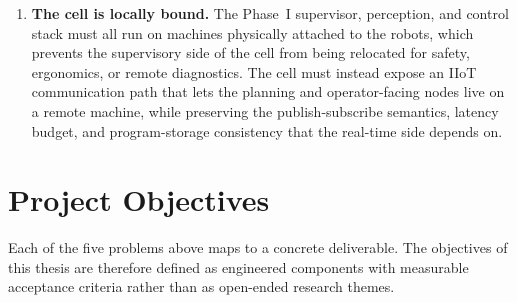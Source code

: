 \begin{enumerate}
    \item \textbf{The cell is locally bound.} The Phase~I supervisor, perception, and control stack must all run on machines physically attached to the robots, which prevents the supervisory side of the cell from being relocated for safety, ergonomics, or remote diagnostics. The cell must instead expose an IIoT communication path that lets the planning and operator-facing nodes live on a remote machine, while preserving the publish-subscribe semantics, latency budget, and program-storage consistency that the real-time side depends on.
\end{enumerate}

\section{Project Objectives}
Each of the five problems above maps to a concrete deliverable. The objectives of this thesis are therefore defined as engineered components with measurable acceptance criteria rather than as open-ended research themes.

